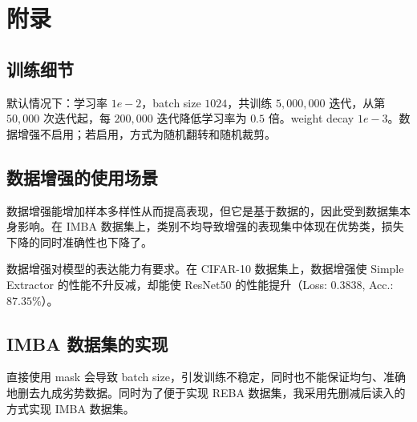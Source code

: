 \documentclass[a4paper]{article}
\begin{document}
\section{附录}
\subsection{训练细节}
默认情况下：学习率 $1e-2$，batch size $1024$，共训练 $5,000,000$ 迭代，从第 $50,000$ 次迭代起，每 $200,000$ 迭代降低学习率为 $0.5$ 倍。weight decay $1e-3$。数据增强不启用；若启用，方式为随机翻转和随机裁剪。

\subsection{数据增强的使用场景}
数据增强能增加样本多样性从而提高表现，但它是基于数据的，因此受到数据集本身影响。在 IMBA 数据集上，类别不均导致增强的表现集中体现在优势类，损失下降的同时准确性也下降了。

数据增强对模型的表达能力有要求。在 CIFAR-10 数据集上，数据增强使 Simple Extractor 的性能不升反减，却能使 ResNet50 的性能提升（Loss: $0.3838$, Acc.: $87.35\%$）。

\subsection{IMBA 数据集的实现}
直接使用 mask 会导致 batch size，引发训练不稳定，同时也不能保证均匀、准确地删去九成劣势数据。同时为了便于实现 REBA 数据集，我采用先删减后读入的方式实现 IMBA 数据集。
\end{document}
